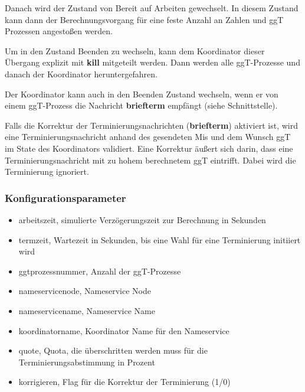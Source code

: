 \documentclass{article}
\begin{document}
Danach wird der Zustand von Bereit auf Arbeiten gewechselt. In diesem Zustand kann dann der Berechnungsvorgang für eine
feste Anzahl an Zahlen und ggT Prozessen angestoßen werden.

Um in den Zustand Beenden zu wechseln, kann dem Koordinator dieser Übergang explizit mit \textbf{kill} mitgeteilt werden.
Dann werden alle ggT-Prozesse und danach der Koordinator heruntergefahren.

Der Koordinator kann auch in den Beenden Zustand wechseln, wenn er von einem ggT-Prozess die Nachricht \textbf{briefterm}
empfängt (siehe Schnittstelle).

Falls die Korrektur der Terminierungsnachrichten (\textbf{briefterm}) aktiviert ist, wird eine Terminierungsnachricht
anhand des gesendeten Mis und dem Wunsch ggT im State des Koordinators validiert. Eine Korrektur äußert sich darin,
dass eine Terminierungsnachricht mit zu hohem berechnetem ggT eintrifft. Dabei wird die Terminierung ignoriert.

\subsubsection{Konfigurationsparameter}
\begin{itemize}
    \item arbeitszeit, simulierte Verzögerungszeit zur Berechnung in Sekunden
    \item termzeit, Wartezeit in Sekunden, bis eine Wahl für eine Terminierung initiiert wird
    \item ggtprozessnummer, Anzahl der ggT-Prozesse
    \item nameservicenode, Nameservice Node
    \item nameservicename, Nameservice Name
    \item koordinatorname, Koordinator Name für den Nameservice
    \item quote, Quota, die überschritten werden muss für die Terminierungsabstimmung in Prozent
    \item korrigieren, Flag für die Korrektur der Terminierung (1/0)
\end{itemize}
\end{document}
